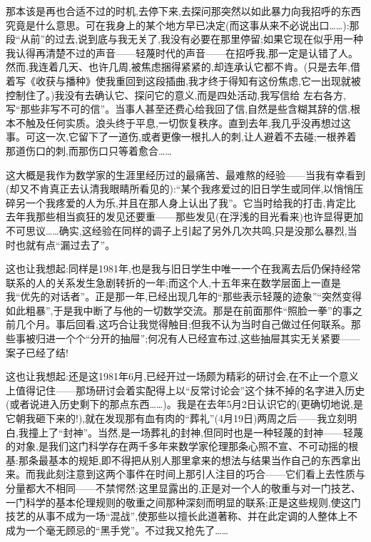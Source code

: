 那本该是再也合适不过的时机,去停下来,去探问那突然以如此暴力向我招呼的东西究竟是什么意思。可在我身上的某个地方早已决定(而这事从来不必说出口……):那段“从前”的过去,说到底与我无关了,我没有必要在那里停留;如果它现在似乎用一种我认得再清楚不过的声音——轻蔑时代的声音——在招呼我,那一定是认错了人。然而,我连着几天、也许几周,被焦虑捆得紧紧的,却连承认它都不肯。(只是去年,借着写《收获与播种》使我重回到这段插曲,我才终于得知有这份焦虑,它一出现就被控制住了。)我没有去确认它、探问它的意义,而是四处活动,我写信给
左右各方,写“那些非写不可的信”。当事人甚至还费心给我回了信,自然是些含糊其辞的信,根本不触及任何实质。浪头终于平息,一切恢复秩序。直到去年,我几乎没再想过这事。可这一次,它留下了一道伤,或者更像一根扎人的刺,让人避着不去碰;一根养着那道伤口的刺,而那伤口只等着愈合……

这大概是我作为数学家的生涯里经历过的最痛苦、最难熬的经验——当我有幸看到(却又不肯真正去认清我眼睛所看见的):“某个我疼爱过的旧日学生或同伴,以悄悄压碎另一个我疼爱的人为乐,并且在那人身上认出了我”。它当时给我的打击,肯定比去年我那些相当疯狂的发见还要重——那些发见(在浮浅的目光看来)也许显得更加不可思议……确实,这经验在同样的调子上引起了另外几次共鸣,只是没那么暴烈,当时也就有点“漏过去了”。

这也让我想起:同样是1981年,也是我与旧日学生中唯一一个在我离去后仍保持经常联系的人的关系发生急剧转折的一年;而这个人,十五年来在数学层面上一直是我“优先的对话者”。正是那一年,已经出现几年的“那些表示轻蔑的迹象”“突然变得如此粗暴”,于是我中断了与他的一切数学交流。那是在前面那件“照脸一拳”的事之前几个月。事后回看,这巧合让我觉得触目;但我不认为当时自己做过任何联系。那些事被归进一个个“分开的抽屉”;何况有人已经宣布过,这些抽屉其实无关紧要——案子已经了结!

这也让我想起:还是这1981年6月,已经开过一场颇为精彩的研讨会,在不止一个意义上值得记住——那场研讨会着实配得上以“反常讨论会”这个抹不掉的名字进入历史(或者说进入历史剩下的那点东西……)。我是在去年5月2日认识它的(更确切地说,是它朝我砸下来的!),就在发现那有血有肉的“葬礼”(4月19日)两周之后——我立刻明白,我撞上了“封神”。当然,是一场葬礼的封神,但同时也是一种轻蔑的封神——轻蔑的对象,是我们这门科学存在两千多年来数学家伦理那条心照不宣、不可动摇的根基:那条最基本的规矩,即不得把从别人那里拿来的想法与结果当作自己的东西拿出来。而我此刻注意到这两个事件在时间上那引人注目的巧合——它们看上去性质与分量都大不相同——不禁愕然:这里显露出的,正是对一个人的敬重与对一门技艺、一门科学的基本伦理规则的敬重之间那种深刻而明显的联系;正是这些规则,使这门技艺的从事不成为一场“混战”,使那些以擅长此道著称、并在此定调的人整体上不成为一个毫无顾忌的“黑手党”。不过我又抢先了……

